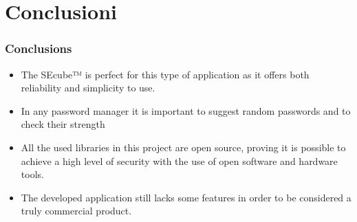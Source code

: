 \documentclass[14pt,usenames,dvipsnames]{beamer}
\begin{document}
\section{Conclusioni}
\begin{frame}
	\frametitle{Conclusions}
	\begin{itemize}
		\setlength\itemsep{10pt}
		\item<1-> The SEcube™ is perfect for this type of application as it offers both reliability and simplicity to use.
		\item<2-> In any password manager it is important to suggest random passwords and to check their strength
		\item<3-> All the used libraries in this project are open source, proving it is possible to achieve a high level of security with the use of open software and hardware tools. 
		\item<4-> The developed application still lacks some features in order to be considered a truly commercial product.
	
	\end{itemize}
\end{frame}
\end{document}
